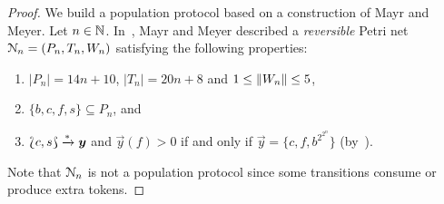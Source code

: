 \begin{proof}
  We build a population protocol based on a construction of Mayr and
  Meyer. Let $n \in \mathbb{N}$. In~\cite[Sect.~6]{MM82}, Mayr and Meyer
  described a \emph{reversible} Petri net $\mathcal{N}_n = (P_n, T_n, W_n)$
  satisfying the following properties:
  \begin{enumerate}
    \item $|P_n| = 14n + 10$, $|T_n| = 20n + 8$ and $1 \leq \lVert W_n\rVert \leq 5$,
    \item $\{b, c, f, s\} \subseteq P_n$, and
    \item $\Lbag c, s\Rbag \xrightarrow{*} \bm{y}$ and $\vec{y}(f) > 0$ if
      and only if $\vec{y} = \{c, f, b^{2^{2^n}}\}$ (by~\cite[Lemma~6
        and~8]{MM82}).
  \end{enumerate}

  Note that $\mathcal{N}_n$ is not a population protocol since some
  transitions consume or produce extra tokens.
\end{proof}
